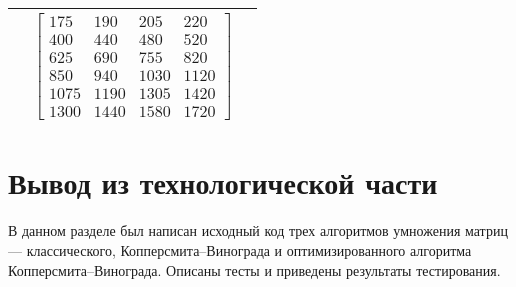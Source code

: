 \begin{table}[H]
\begin{tabular}{|p{4.5cm}|p{4.5cm}|p{6.8cm}|}
& 
\begin{equation*}
\begin{bmatrix}
175 & 190 & 205 & 220 \\
400 & 440 & 480 & 520 \\
625 & 690 & 755 & 820 \\
850 & 940 & 1030 & 1120 \\
1075 & 1190 & 1305 & 1420 \\
1300 & 1440 & 1580 & 1720
\end{bmatrix}
\end{equation*} \tabularnewline
\hline
\end{tabular}
\end{table}

\section*{Вывод из технологической части}

В данном разделе был написан исходный код трех алгоритмов умножения матриц --- классического, Копперсмита--Винограда и оптимизированного алгоритма Копперсмита--Винограда. Описаны тесты и приведены результаты тестирования.
